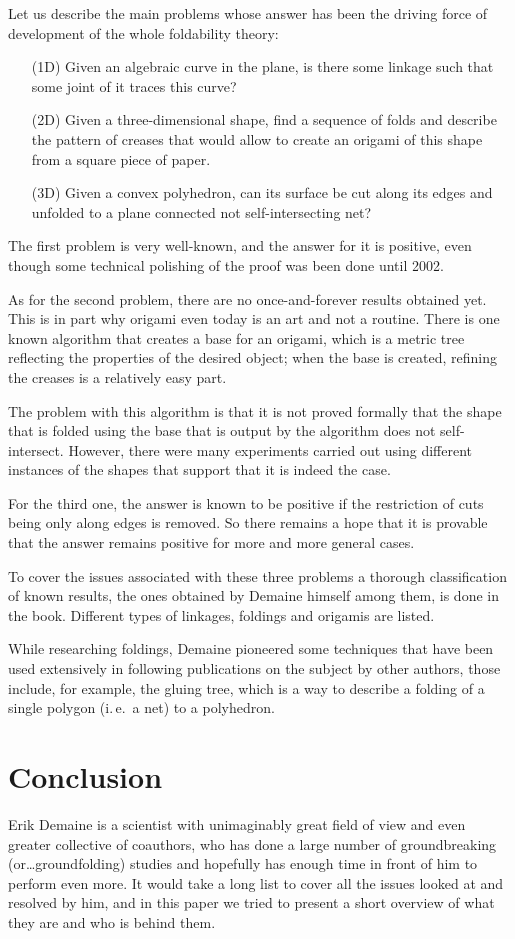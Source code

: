\documentclass[a4paper,12pt]{article}
\begin{document}
Let us describe the main problems whose answer has been the driving force of development of the whole foldability theory: \begin{enumerate}
	\item[(1D)] Given an algebraic curve in the plane, is there some linkage such that some joint of it traces this curve?
	\item[(2D)] Given a three-dimensional shape, find a sequence of folds and describe the pattern of creases that would allow to create an origami of this shape from a square piece of paper.
	\item[(3D)] Given a convex polyhedron, can its surface be cut along its edges and unfolded to a plane connected not self-intersecting net?
\end{enumerate}

The first problem is very well-known, and the answer for it is positive, even though some technical polishing of the proof was been done until 2002.

As for the second problem, there are no once-and-forever results obtained yet. This is in part why origami even today is an art and not a routine. There is one known algorithm that creates a base for an origami, which is a metric tree reflecting the properties of the desired object; when the base is created, refining the creases is a relatively easy part.

The problem with this algorithm is that it is not proved formally that the shape that is folded using the base that is output by the algorithm does not self-intersect. However, there were many experiments carried out using different instances of the shapes that support that it is indeed the case.

For the third one, the answer is known to be positive if the restriction of cuts being only along edges is removed. So there remains a hope that it is provable that the answer remains positive for more and more general cases.

To cover the issues associated with these three problems a thorough classification of known results, the ones obtained by Demaine himself among them, is done in the book. Different types of linkages, foldings and origamis are listed.

While researching foldings, Demaine pioneered some techniques that have been used extensively in following publications on the subject by other authors, those include, for example, the gluing tree, which is a way to describe a folding of a single polygon (i.\,e.~a net) to a polyhedron.

\section{Conclusion}

Erik Demaine is a scientist with unimaginably great field of view and even greater collective of coauthors, who has done a large number of groundbreaking (or\ldots groundfolding) studies and hopefully has enough time in front of him to perform even more. It would take a long list to cover all the issues looked at and resolved by him, and in this paper we tried to present a short overview of what they are and who is behind them. \newpage

{}

\end{document}
